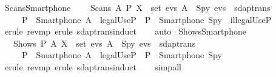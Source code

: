 \begin{isabellebody}
  \endisatagproof
  {\isafoldproof}%
  \isadelimproof
  \isanewline
  \endisadelimproof
  \isanewline
  \isanewline
  \isamarkupfalse%
  \ Scans{\isacharunderscore}Smartphone\ {\isacharcolon}\isanewline
  \ \ {\isachardoublequoteopen}{\isasymlbrakk}\ Scans\ A\ P\ X\ {\isasymin}\ set\ evs{\isacharsemicolon}\ A\ {\isasymnoteq}\ Spy{\isacharsemicolon}\ evs\ {\isasymin}\ sdaptrans\ {\isasymrbrakk}\isanewline
  \ \ \ \ {\isasymLongrightarrow}\ {\isacharparenleft}P\ {\isacharequal}\ {\isacharparenleft}Smartphone\ A{\isacharparenright}\ {\isasymand}\ legalUse{\isacharparenleft}P{\isacharparenright}{\isacharparenright}\ {\isasymor}\ {\isacharparenleft}P\ {\isacharequal}\ {\isacharparenleft}Smartphone\ Spy{\isacharparenright}\ {\isasymand}\ illegalUse{\isacharparenleft}P{\isacharparenright}{\isacharparenright}{\isachardoublequoteclose}\isanewline
  \isadelimproof
  \ \ \isanewline
  \ \ %
  \endisadelimproof
  \isatagproof
  \isamarkupfalse%
  \ {\isacharparenleft}erule\ rev{\isacharunderscore}mp{\isacharcomma}\ erule\ sdaptrans{\isachardot}induct{\isacharparenright}\isanewline
  \ \ \isamarkupfalse%
  \ {\isacharparenleft}auto{\isacharparenright}\isanewline
  \isamarkupfalse%
  \endisatagproof
  {\isafoldproof}%
  \isadelimproof
  \isanewline
  \endisadelimproof
  \isanewline
  \isamarkupfalse%
  \ Shows{\isacharunderscore}Smartphone\ {\isacharcolon}\isanewline
  \ \ {\isachardoublequoteopen}{\isasymlbrakk}\ Shows\ P\ A\ X\ {\isasymin}\ set\ evs{\isacharsemicolon}\ A\ {\isasymnoteq}\ Spy{\isacharsemicolon}\ evs\ {\isasymin}\ sdaptrans\ {\isasymrbrakk}\isanewline
  \ \ \ \ {\isasymLongrightarrow}\ {\isacharparenleft}P\ {\isacharequal}\ {\isacharparenleft}Smartphone\ A{\isacharparenright}\ {\isasymand}\ legalUse{\isacharparenleft}P{\isacharparenright}{\isacharparenright}\ {\isasymor}\ {\isacharparenleft}P\ {\isacharequal}\ {\isacharparenleft}Smartphone\ Spy{\isacharparenright}{\isacharparenright}{\isachardoublequoteclose}\isanewline
  \isadelimproof
  \isanewline
  \ \ %
  \endisadelimproof
  \isatagproof
  \isamarkupfalse%
  \ {\isacharparenleft}erule\ rev{\isacharunderscore}mp{\isacharcomma}\ erule\ sdaptrans{\isachardot}induct{\isacharparenright}\isanewline
  \ \ \isamarkupfalse%
  \ {\isacharparenleft}simp{\isacharunderscore}all{\isacharparenright}\isanewline
  \isamarkupfalse%
  \endisatagproof
  {\isafoldproof}%
  \isadelimproof
  \isanewline
  \endisadelimproof
  \isanewline

\end{isabellebody}
